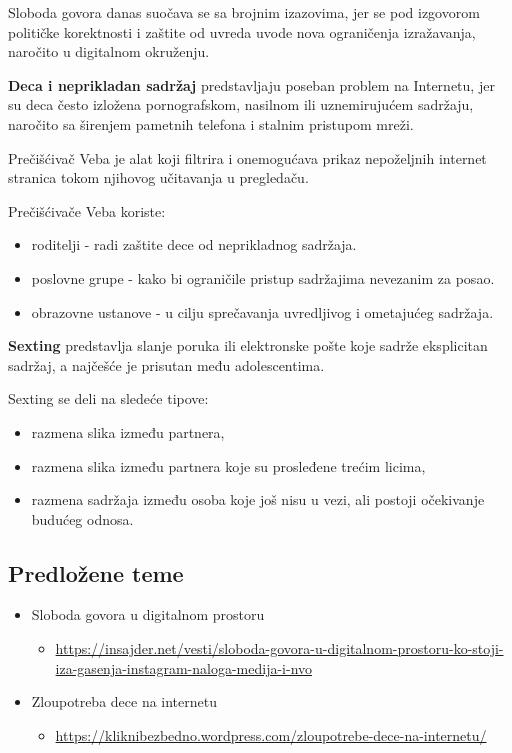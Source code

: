 \documentclass[a4paper, 12pt]{article}
\begin{document}
Sloboda govora danas suočava se sa brojnim izazovima, jer se pod izgovorom
političke korektnosti i zaštite od uvreda uvode nova ograničenja izražavanja, naročito u digitalnom okruženju.

\vspace{\baselineskip}

\textbf{Deca i neprikladan sadržaj} predstavljaju poseban problem na Internetu, jer su
deca često izložena pornografskom, nasilnom ili uznemirujućem sadržaju, naročito
sa širenjem pametnih telefona i stalnim pristupom mreži.

Prečišćivač Veba je alat koji filtrira i onemogućava prikaz nepoželjnih
internet stranica tokom njihovog učitavanja u pregledaču.

Prečišćivače Veba koriste:
\begin{itemize}
    \item roditelji - radi zaštite dece od neprikladnog sadržaja.
    \item poslovne grupe - kako bi ograničile pristup sadržajima nevezanim za posao.
    \item obrazovne ustanove - u cilju sprečavanja uvredljivog i ometajućeg sadržaja.
\end{itemize}

\vspace{\baselineskip}

\textbf{Sexting} predstavlja slanje poruka ili elektronske pošte koje sadrže eksplicitan
sadržaj, a najčešće je prisutan među adolescentima.

Sexting se deli na sledeće tipove:
\begin{itemize}
    \item razmena slika između partnera,
    \item razmena slika između partnera koje su prosleđene trećim licima,
    \item razmena sadržaja između osoba koje još nisu u vezi, ali postoji očekivanje
    budućeg odnosa.
\end{itemize}

\subsection{Predložene teme}

\begin{itemize}
    \item Sloboda govora u digitalnom prostoru
    \begin{itemize}
        \item \url{https://insajder.net/vesti/sloboda-govora-u-digitalnom-prostoru-ko-stoji-iza-gasenja-instagram-naloga-medija-i-nvo}
    \end{itemize}
    \item Zloupotreba dece na internetu
    \begin{itemize}
        \item \url{https://kliknibezbedno.wordpress.com/zloupotrebe-dece-na-internetu/}
    \end{itemize}
    
\end{itemize}
\end{document}
